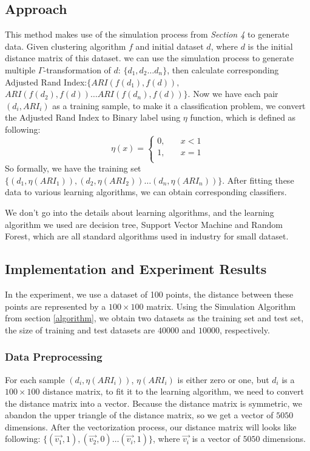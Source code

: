 \documentclass{uonmathreport}
\begin{document}
\subsection{Approach} 
\label{subsec:approach}
This method makes use of the simulation process from \textit{Section 4} to generate data. Given clustering algorithm $f$ and initial dataset $d$, where $d$ is the initial distance matrix of this dataset. we can use the simulation process to generate multiple $\Gamma$-transformation of $d$: $\{d_1,d_2\ldots d_n\}$, then calculate corresponding Adjusted Rand Index:$\{ARI(f(d_1),f(d)),$ $ARI(f(d_2),f(d))
\ldots  ARI(f(d_n),f(d))\}$. Now we have each pair $(d_i,ARI_i)$ as a training sample, to make it a classification problem, we convert the Adjusted Rand Index to Binary label using $\eta$ function, which is defined as following:
\[   
\eta(x) = 
     \begin{cases}
       0, &\quad x<1 \\
       1, &\quad x = 1 \\
     \end{cases}
\]
So formally, we have the training set $\{(d_1,\eta(ARI_1)),(d_2,\eta(ARI_2))\ldots (d_n,\eta(ARI_n))\}$. After fitting these data to various learning algorithms, we can obtain corresponding classifiers. 

We don't go into the details about learning algorithms, and the learning algorithm we used are decision tree, Support Vector Machine and Random Forest, which are all standard algorithms used in industry for small dataset.

\subsection{Implementation and Experiment Results} 
In the experiment, we use a dataset of 100 points, the distance between these points are represented by a $100\times100$ matrix. Using the Simulation Algorithm from section \ref{algorithm}, we obtain two datasets as the training set and test set, the size of training and test datasets are $40000$ and $10000$, respectively.
\subsubsection{Data Preprocessing} 
\label{subsec:Experiment}
For each sample $(d_i,\eta(ARI_i))$, $\eta(ARI_i)$ is either zero or one,  but $d_i$ is a $100\times100$ distance matrix, to fit it to the learning algorithm, we need to convert the distance matrix into a vector. Because the distance matrix is symmetric, we abandon the upper triangle of the distance matrix, so we get a vector of $5050$ dimensions. After the vectorization process, our distance matrix will looks like following: $\{(\vec{v_1},1),(\vec{v_2},0)\ldots (\vec{v_i},1)\}$, where $\vec{v_i}$ is a vector of $5050$ dimensions. 
\end{document}
